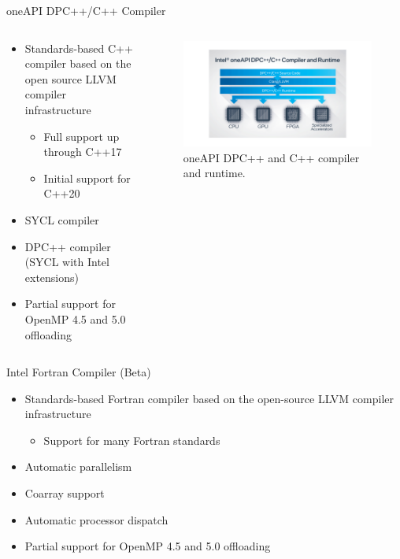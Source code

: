 \documentclass[aspectratio=169]{beamer}
\begin{document}
\begin{frame}{oneAPI DPC++/C++ Compiler}
\begin{columns}
\begin{column}{0.5\textwidth}
\begin{itemize}
  \item Standards-based C++ compiler based on the open source LLVM compiler infrastructure
  \begin{itemize}
    \item Full support up through C++17
    \item Initial support for C++20
  \end{itemize}
  \item SYCL compiler
  \item DPC++ compiler (SYCL with Intel extensions)
  \item Partial support for OpenMP 4.5 and 5.0 offloading
\end{itemize}
\end{column}
\begin{column}{0.5\textwidth}
\begin{figure}
  \includegraphics[width=\linewidth]{figures/diagram-oneapi-dpc-c-compiler-16x9.png}
  \caption{oneAPI DPC++ and C++ compiler and runtime.}
\end{figure}
\end{column}
\end{columns}
\end{frame}

\begin{frame}{Intel Fortran Compiler (Beta)}
\begin{itemize}
  \item Standards-based Fortran compiler based on the open-source LLVM compiler infrastructure
  \begin{itemize}
    \item Support for many Fortran standards
  \end{itemize}
  \item Automatic parallelism
  \item Coarray support
  \item Automatic processor dispatch
  \item Partial support for OpenMP 4.5 and 5.0 offloading
\end{itemize}
\end{frame}
\end{document}

